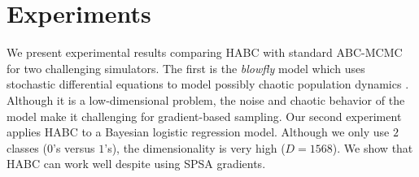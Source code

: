 \documentclass[]{article}
\begin{document}


\section{Experiments}\label{sec:experiments}
We present experimental results comparing HABC with standard ABC-MCMC for two challenging simulators.   The first is the {\em blowfly} model which uses stochastic differential equations to model possibly chaotic population dynamics \cite{wood2010statistical}.  Although it is a low-dimensional problem, the noise and chaotic behavior of the model make it challenging for gradient-based sampling.  Our second experiment applies HABC to a Bayesian logistic regression model.  Although we only use $2$ classes ($0$'s versus $1$'s), the dimensionality is very high ($D=1568$).  We show that HABC can work well despite using SPSA  gradients.
\end{document}
